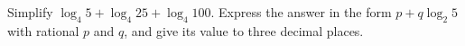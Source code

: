 Simplify $\log_4 5+\log_4 25+\log_4 100$. Express the answer in the form $p+q\log_2 5$ with rational $p$ and $q$, and give its value to three decimal places.
